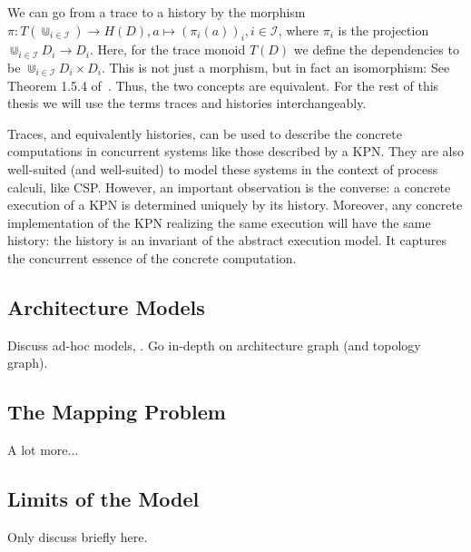 We can go from a trace to a history by the morphism $\pi: T(\Cup_{i \in \mathcal{I}}) \rightarrow H(D), a \mapsto (\pi_i(a))_i, i \in \mathcal{I}$, where $\pi_i$ is the projection $\Cup_{i \in \mathcal{I}}D_i \rightarrow D_i$.
Here, for the trace monoid $T(D)$ we define the dependencies to be $\Cup_{i \in \mathcal{I}}D_i \times D_i$. 
This is not just a morphism, but in fact an isomorphism: See Theorem 1.5.4 of~\cite{mazurkiewicz1995introduction}.
Thus, the two concepts are equivalent.
For the rest of this thesis we will use the terms traces and histories interchangeably.


Traces, and equivalently histories, can be used to describe the concrete computations in concurrent systems like those described by a \ac{KPN}.
They are also well-suited (and well-suited) to model these systems in the context of process calculi, like \ac{CSP}.
However, an important observation is the converse: a concrete execution of a \ac{KPN} is determined uniquely by its history.
Moreover, any concrete implementation of the \ac{KPN} realizing the same execution will have the same history: the history is an invariant of the abstract execution model.
It captures the concurrent essence of the concrete computation.

\subsection{Architecture Models}
Discuss ad-hoc models, \cite{pelcat2015models}. Go in-depth on architecture graph (and topology graph).

\subsection{The Mapping Problem}
A lot more...\cite{singh2013mapping} \cite{marwedel2011mapping}

\subsection{Limits of the Model}
Only discuss briefly here.
